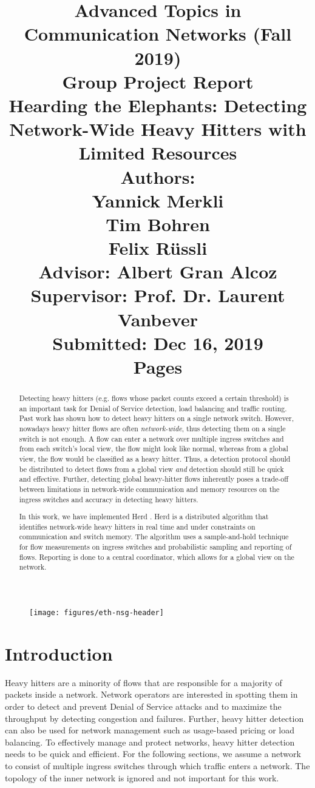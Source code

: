 \documentclass[11pt,oneside,a4paper]{article}
\title{
    \vspace*{0.0mm}
    \LARGE\bf\sf Advanced Topics in \\Communication Networks (Fall 2019)
    \vspace*{10.0mm} \\
    \Large\bf\sf Group Project Report \vspace*{30.0mm}\\
    \Huge\bf\sf Hearding the Elephants: Detecting Network-Wide Heavy Hitters with Limited Resources
    \vspace*{30.0mm} \\
    \normalsize
    \sf Authors:\\[5pt]
    \sf Yannick Merkli\\ [5pt]
    \sf Tim Bohren\\ [5pt]
    \sf Felix Rüssli \vspace*{5mm}\\
    \sf  Advisor: Albert Gran Alcoz \vspace*{5mm}\\
    \sf  Supervisor:  Prof. Dr. Laurent Vanbever \vspace*{20.0mm}\\
    \sf Submitted: Dec 16, 2019\\ [5pt]
    \sf \pageref{lastpage} Pages
}
\date{}
\begin{document}
\begin{figure}
    \texttt{[image: figures/eth-nsg-header]}
\end{figure}

\maketitle
\thispagestyle{empty}
\raggedbottom
\clearpage


\begin{abstract}
\noindent Detecting heavy hitters (e.g. flows whose packet counts exceed a certain threshold) is an important task for Denial of Service detection, load balancing and traffic routing. Past work has shown how to detect heavy hitters on a single network switch. However, nowadays heavy hitter flows are often \textit{network-wide}, thus detecting them on a single switch is not enough. A flow can enter a network over multiple ingress switches and from each switch's local view, the flow might look like normal, whereas from a global view, the flow would be classified as a heavy hitter. Thus, a detection protocol should be distributed to detect flows from a global view \textit{and} detection should still be quick and effective. Further, detecting global heavy-hitter flows inherently poses a trade-off between limitations in network-wide communication and memory resources on the ingress switches and accuracy in detecting heavy hitters. 

In this work, we have implemented Herd \cite{anon2019herd}. Herd is a distributed algorithm that identifies network-wide heavy hitters in real time and under constraints on communication and switch memory. The algorithm uses a sample-and-hold technique for flow measurements on ingress switches and probabilistic sampling and reporting of flows. Reporting is done to a central coordinator, which allows for a global view on the network.

\end{abstract}

\clearpage
\setcounter{tocdepth}{2}
\tableofcontents
\clearpage
{}

\section{Introduction}

Heavy hitters are a minority of flows that are responsible for a majority of packets inside a network. Network operators are interested in spotting them in order to detect and prevent Denial of Service attacks and to maximize the throughput by detecting congestion and failures. Further, heavy hitter detection can also be used for network management such as usage-based pricing or load balancing. To effectively manage and protect networks, heavy hitter detection needs to be quick and efficient. For the following sections, we assume a network to consist of multiple ingress switches through which traffic enters a network. The topology of the inner network is ignored and not important for this work.
\end{document}
